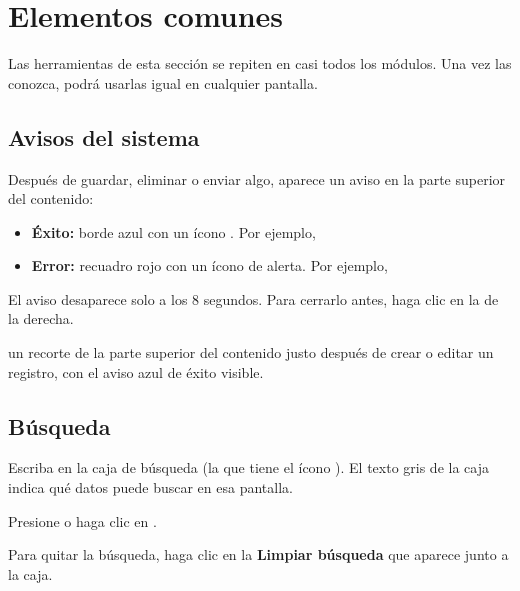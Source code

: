 \section{Elementos comunes}\label{sec:comunes}

Las herramientas de esta sección se repiten en casi todos los módulos. Una vez las conozca,
podrá usarlas igual en cualquier pantalla.

\subsection{Avisos del sistema}\label{sec:avisos}

Después de guardar, eliminar o enviar algo, aparece un aviso en la parte superior del contenido:

\begin{itemize}
  \item \textbf{Éxito:} borde azul con un ícono \icono{\icOk}. Por ejemplo,
  \item \textbf{Error:} recuadro rojo con un ícono de alerta. Por ejemplo,
\end{itemize}

El aviso desaparece solo a los 8 segundos. Para cerrarlo antes, haga clic en la \icono[pizarra]{\icCerrar}
de la derecha.

  {un recorte de la parte superior del contenido justo después de crear o editar un registro,
   con el aviso azul de éxito visible.}

\subsection{Búsqueda}\label{sec:busqueda}

\begin{pasos}
  \item Escriba en la caja de búsqueda (la que tiene el ícono \icono[pizarra]{\icBuscar}). El texto gris
        de la caja indica qué datos puede buscar en esa pantalla.
  \item Presione  o haga clic en .
  \item Para quitar la búsqueda, haga clic en la \icono[pizarra]{\icCerrar} \textbf{Limpiar búsqueda}
        que aparece junto a la caja.
\end{pasos}

